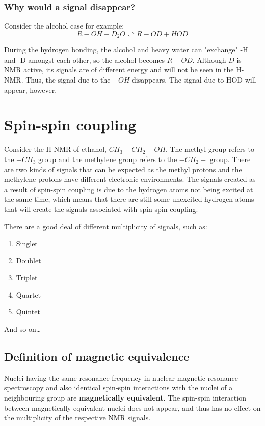 \documentclass[11pt]{article}
\begin{document}
\subsubsection{Why would a signal disappear?}
\label{sec:orgca4f3fc}
Consider the alcohol case for example:
\[R-OH + D_2O \rightleftharpoons R-OD + HOD\]

During the hydrogen bonding, the alcohol and heavy water can "exchange" -H and -D amongst each other, so the alcohol becomes \(R-OD\). Although \(D\) is NMR active, its signals are of different energy and will not be seen in the H-NMR. Thus, the signal due to the \(-OH\) disappears. The signal due to HOD will appear, however.

\newpage
\section{Spin-spin coupling}
\label{sec:orga3002cd}
Consider the H-NMR of ethanol, \(CH_3 - CH_2 - OH\). The methyl group refers to the \(-CH_3\) group and the methylene group refers to the \(-CH_2-\) group. There are two kinds of signals that can be expected as the methyl protons and the methylene protons have different electronic environments. The signals created as a result of spin-spin coupling is due to the hydrogen atoms not being excited at the same time, which means that there are still some unexcited hydrogen atoms that will create the signals associated with spin-spin coupling.


There are a good deal of different multiplicity of signals, such as:
\begin{enumerate}
\item Singlet
\item Doublet
\item Triplet
\item Quartet
\item Quintet
\end{enumerate}

And so on\ldots{}
\subsection{Definition of magnetic equivalence}
\label{sec:org338a25e}
Nuclei having the same resonance frequency in nuclear magnetic resonance spectroscopy and also identical spin-spin interactions with the nuclei of a neighbouring group are \textbf{magnetically equivalent}. The spin-spin interaction between magnetically equivalent nuclei does not appear, and thus has no effect on the multiplicity of the respective NMR signals.
\end{document}
